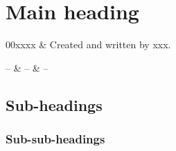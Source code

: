 %
%
\chapter{Main heading}


%
%
\starthistory
  00xxxx & Created and written by xxx.\\
\stophistory


%
%
%
\startsymbols
  -- & -- & -- \\
\stopsymbols



%
%




\section{Sub-headings}

 \subsection{Sub-sub-headings} 


